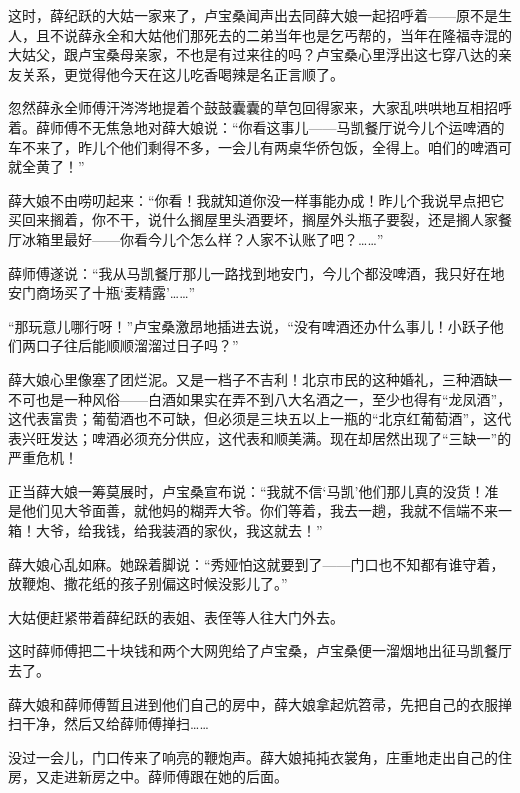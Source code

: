 \par 这时，薛纪跃的大姑一家来了，卢宝桑闻声出去同薛大娘一起招呼着——原不是生人，且不说薛永全和大姑他们那死去的二弟当年也是乞丐帮的，当年在隆福寺混的大姑父，跟卢宝桑母亲家，不也是有过来往的吗？卢宝桑心里浮出这七穿八达的亲友关系，更觉得他今天在这儿吃香喝辣是名正言顺了。
\par 忽然薛永全师傅汗涔涔地提着个鼓鼓囊囊的草包回得家来，大家乱哄哄地互相招呼着。薛师傅不无焦急地对薛大娘说：“你看这事儿——马凯餐厅说今儿个运啤酒的车不来了，昨儿个他们剩得不多，一会儿有两桌华侨包饭，全得上。咱们的啤酒可就全黄了！”
\par 薛大娘不由唠叨起来：“你看！我就知道你没一样事能办成！昨儿个我说早点把它买回来搁着，你不干，说什么搁屋里头酒要坏，搁屋外头瓶子要裂，还是搁人家餐厅冰箱里最好——你看今儿个怎么样？人家不认账了吧？……”
\par 薛师傅遂说：“我从马凯餐厅那儿一路找到地安门，今儿个都没啤酒，我只好在地安门商场买了十瓶‘麦精露’……”
\par “那玩意儿哪行呀！”卢宝桑激昂地插进去说，“没有啤酒还办什么事儿！小跃子他们两口子往后能顺顺溜溜过日子吗？”
\par 薛大娘心里像塞了团烂泥。又是一档子不吉利！北京市民的这种婚礼，三种酒缺一不可也是一种风俗——白酒如果实在弄不到八大名酒之一，至少也得有“龙凤酒”，这代表富贵；葡萄酒也不可缺，但必须是三块五以上一瓶的“北京红葡萄酒”，这代表兴旺发达；啤酒必须充分供应，这代表和顺美满。现在却居然出现了“三缺一”的严重危机！
\par 正当薛大娘一筹莫展时，卢宝桑宣布说：“我就不信‘马凯’他们那儿真的没货！准是他们见大爷面善，就他妈的糊弄大爷。你们等着，我去一趟，我就不信端不来一箱！大爷，给我钱，给我装酒的家伙，我这就去！”
\par 薛大娘心乱如麻。她跺着脚说：“秀娅怕这就要到了——门口也不知都有谁守着，放鞭炮、撒花纸的孩子别偏这时候没影儿了。”
\par 大姑便赶紧带着薛纪跃的表姐、表侄等人往大门外去。
\par 这时薛师傅把二十块钱和两个大网兜给了卢宝桑，卢宝桑便一溜烟地出征马凯餐厅去了。
\par 薛大娘和薛师傅暂且进到他们自己的房中，薛大娘拿起炕笤帚，先把自己的衣服掸扫干净，然后又给薛师傅掸扫……
\par 没过一会儿，门口传来了响亮的鞭炮声。薛大娘扽扽衣裳角，庄重地走出自己的住房，又走进新房之中。薛师傅跟在她的后面。


